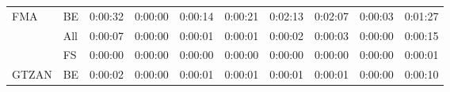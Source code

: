 \begin{table}[H]
{\begin{tabular}{llllllllll}
    \multirow{-3}{*}{FMA}   & \multicolumn{1}{l|}{\cellcolor[HTML]{EFEFEF}BE}  & \cellcolor[HTML]{EFEFEF}0:00:32 & \cellcolor[HTML]{EFEFEF}0:00:00 & \cellcolor[HTML]{EFEFEF}0:00:14 & \cellcolor[HTML]{EFEFEF}0:00:21 & \cellcolor[HTML]{EFEFEF}0:02:13 & \cellcolor[HTML]{EFEFEF}0:02:07 & \cellcolor[HTML]{EFEFEF}0:00:03 & \cellcolor[HTML]{EFEFEF}0:01:27 \\ \cline{1-2}
                            & \multicolumn{1}{l|}{All}                         & 0:00:07                         & 0:00:00                         & 0:00:01                         & 0:00:01                         & 0:00:02                         & 0:00:03                         & 0:00:00                         & 0:00:15                         \\
                            & \multicolumn{1}{l|}{\cellcolor[HTML]{EFEFEF}FS}  & \cellcolor[HTML]{EFEFEF}0:00:00 & \cellcolor[HTML]{EFEFEF}0:00:00 & \cellcolor[HTML]{EFEFEF}0:00:00 & \cellcolor[HTML]{EFEFEF}0:00:00 & \cellcolor[HTML]{EFEFEF}0:00:00 & \cellcolor[HTML]{EFEFEF}0:00:00 & \cellcolor[HTML]{EFEFEF}0:00:00 & \cellcolor[HTML]{EFEFEF}0:00:01 \\
    \multirow{-3}{*}{GTZAN} & \multicolumn{1}{l|}{BE}                          & 0:00:02                         & 0:00:00                         & 0:00:01                         & 0:00:01                         & 0:00:01                         & 0:00:01                         & 0:00:00                         & 0:00:10                        
    \end{tabular}}
\end{table}

